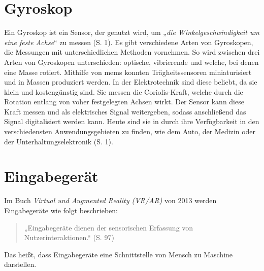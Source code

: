 \section{Gyroskop}
Ein Gyroskop ist ein Sensor, der genutzt wird, um „\textit{die Winkelgeschwindigkeit um eine feste Achse}“ zu messen (S. 1)\cite{armeniseAdvancesGyroscopeTechnologies2010}.
Es gibt verschiedene Arten von Gyroskopen, die Messungen mit unterschiedlichen Methoden vornehmen.
So wird zwischen drei Arten von Gyroskopen unterschieden: optische, vibrierende und welche, bei denen eine Masse rotiert.
Mithilfe von \ac{mems} konnten Trägheitssensoren miniaturisiert und in Massen produziert werden.
In der Elektrotechnik sind diese beliebt, da sie klein und kostengünstig sind\cite{maenakaMEMSInertialSensors2008}.
Sie messen die Coriolis-Kraft, welche durch die Rotation entlang von voher festgelegten Achsen wirkt.
Der Sensor kann diese Kraft messen und als elektrisches Signal weitergeben, sodass anschließend das Signal digitalisiert werden kann\cite{utmelMPU6050ModuleDatasheet}.
Heute sind sie in durch ihre Verfügbarkeit in den verschiedensten Anwendungsgebieten zu finden, wie dem Auto, der Medizin oder der Unterhaltungselektronik (S. 1)\cite{armeniseAdvancesGyroscopeTechnologies2010}.

\section{Eingabegerät}
Im Buch \textit{Virtual und Augmented Reality (VR/AR)} von 2013 werden Eingabegeräte wie folgt beschrieben:

\begin{quote}
    „Eingabegeräte dienen der sensorischen Erfassung von Nutzerinteraktionen.“ (S. 97)\cite{doernerVirtualUndAugmented2013}
\end{quote}

Das heißt, dass Eingabegeräte eine Schnittstelle von Mensch zu Maschine darstellen.
